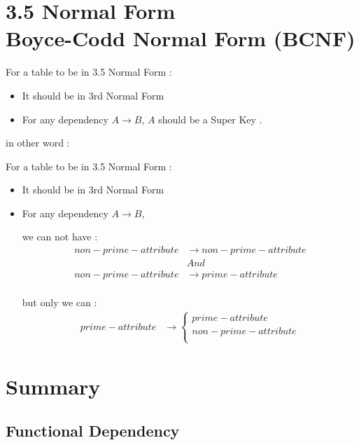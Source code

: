 \documentclass[10pt]{article}
\begin{document}
\newpage

\section{3.5 Normal Form \\ Boyce-Codd Normal Form (BCNF)}

For a table to be in 3.5 Normal Form :

\begin{itemize}
	\item It should be in 3rd Normal Form
	\item For any dependency $A \to B$, $A$ should be a Super Key . \\
\end{itemize}


in other word :

For a table to be in 3.5 Normal Form :

\begin{itemize}
	\item It should be in 3rd Normal Form
	\item For any dependency $A \to B$, 
	
	we can not have :
	\begin{align*}
	non-prime-attribute &\to non-prime-attribute \\
	&And \\
	non-prime-attribute &\to prime-attribute \\
	\end{align*}
	
	but only we can :
	\begin{align*}
	prime-attribute &\to 
	\begin{cases}
	prime-attribute \\
	non-prime-attribute \\
	\end{cases}
	\end{align*}
	
\end{itemize}



\section{Summary}


\subsection{Functional Dependency}
\end{document}
